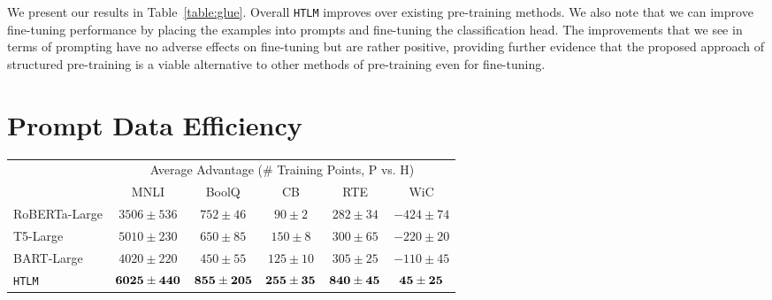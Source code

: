 \documentclass[11pt,a4paper]{article}
\newif\ifshownlg
\newcommand{\HTLM}{\texttt{HTLM}}
\begin{document}
\begin{table*}[ht]
\begin{tabular}{@{}lcccccccc@{}}
\end{tabular}
\caption{Results on the GLUE development set for various fine-tuning methods
applied to \HTLM{}.}
\label{table:glue}
\end{table*}

We present our results in Table~\ref{table:glue}. Overall \HTLM{} improves over existing pre-training methods. We also note that we can improve fine-tuning performance by placing the examples into prompts and fine-tuning the classification head. The improvements that we see in terms of prompting have no adverse effects on fine-tuning but are rather positive, providing further evidence that the proposed approach of structured pre-training is a viable alternative to other methods of pre-training even for fine-tuning.

\ifshownlg We also show our fine-tuning results for the table-to-text generation datasets in Table~\ref{tab:table-to-text}. Similar to GLUE fine-tuning, we place all NLG samples into a prompt while fine-tuning. \HTLM{} fine-tuned is able to outperform both variants of the GPT-2 model consistently.\fi
\section{Prompt Data Efficiency}
\begin{table*}[htpb!]
\centering
\begin{tabular}{@{}l ccccc@{}}
\toprule 
& \multicolumn{5}{c}{Average Advantage (\# Training Points, P vs. H)} \\
& MNLI & BoolQ & CB & RTE & WiC\\\midrule 
RoBERTa-Large & $3506\pm536$ & $752\pm46$ & $90\pm2$ & $282\pm34$ & $-424\pm74$\\
T5-Large & $5010\pm230$ & $650\pm85$ & $150\pm8$ & $300\pm65$ & $-220\pm20$\\
BART-Large & $4020\pm220$ & $450\pm55$ & $125\pm10$ & $305\pm25$ & $-110\pm45$\\ \midrule
\HTLM{} & $\bf{6025\pm440}$ & $\bf{855\pm205}$ & $\bf{255\pm35}$ & $\bf{840\pm45}$ & $\bf{45\pm25}$\\
\bottomrule
\end{tabular}
\caption{Average advantage (higher is better)  in terms of training points for fine-tuning well-structured prompt ($P$) against a classical classification head ($H$).}
\label{table:data_points_per_prompt_p_h}
\end{table*}
\end{document}
